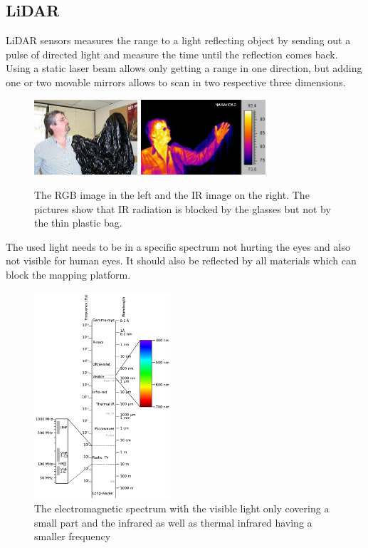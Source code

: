 \subsection{LiDAR}\label{ssec:lidar}

\ac{LiDAR} sensors measures the range to a light reflecting object by sending out a pulse of directed light and measure the time until the reflection comes back.
Using a static laser beam allows only getting a range in one direction, but adding one or two movable mirrors allows to scan in two respective three dimensions.

\begin{figure}
    \centering
    \includegraphics[height=2.8cm]{img/fundamentals/Human-Visible.jpg}
    \includegraphics[height=2.8cm]{img/fundamentals/Human-Infrared.jpg}

    \caption{The RGB image in the left and the IR image on the right. The pictures show that IR radiation is blocked by the glasses but not by the thin plastic bag.}
    \label{fig:humanIRVIS}
\end{figure}

The used light needs to be in a specific spectrum not hurting the eyes and also not visible for human eyes.
It should also be reflected by all materials which can block the mapping platform.

\begin{figure}
    \centering
    \includegraphics[width=0.45\textwidth]{img/fundamentals/em_spectrum.png}
    \caption{The electromagnetic spectrum with the visible light only covering a small part and the infrared as well as thermal infrared having a smaller frequency \cite{spectrum}
    }
    \label{fig:spectrum}
\end{figure}


